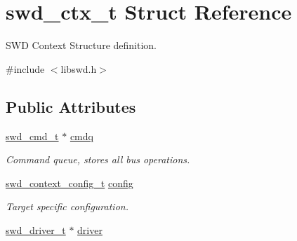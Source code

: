 \hypertarget{structswd__ctx__t}{
\section{swd\_\-ctx\_\-t Struct Reference}
\label{structswd__ctx__t}
}


SWD Context Structure definition.  




{\ttfamily \#include $<$libswd.h$>$}

\subsection*{Public Attributes}
\begin{DoxyCompactItemize}
\item 
\hypertarget{structswd__ctx__t_abbf4c96d5d0cfde93e6441906161c433}{
\hyperlink{structswd__cmd__t}{swd\_\-cmd\_\-t} $\ast$ \hyperlink{structswd__ctx__t_abbf4c96d5d0cfde93e6441906161c433}{cmdq}}
\label{structswd__ctx__t_abbf4c96d5d0cfde93e6441906161c433}

\begin{DoxyCompactList}\small\item\em Command queue, stores all bus operations. \item\end{DoxyCompactList}\item 
\hypertarget{structswd__ctx__t_a6398e41baed39e1c051396cf7079f35e}{
\hyperlink{structswd__context__config__t}{swd\_\-context\_\-config\_\-t} \hyperlink{structswd__ctx__t_a6398e41baed39e1c051396cf7079f35e}{config}}
\label{structswd__ctx__t_a6398e41baed39e1c051396cf7079f35e}

\begin{DoxyCompactList}\small\item\em Target specific configuration. \item\end{DoxyCompactList}\item 
\hypertarget{structswd__ctx__t_a1af708535f1167ac7909e62dbda0296c}{
\hyperlink{structswd__driver__t}{swd\_\-driver\_\-t} $\ast$ \hyperlink{structswd__ctx__t_a1af708535f1167ac7909e62dbda0296c}{driver}}
\label{structswd__ctx__t_a1af708535f1167ac7909e62dbda0296c}


\end{DoxyCompactItemize}
